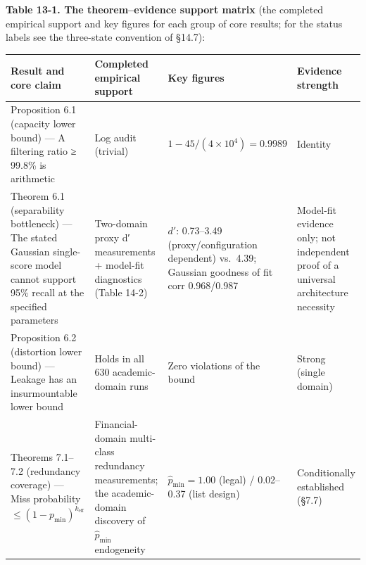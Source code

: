 \documentclass[
  11pt]{article}
\begin{document}
\textbf{Table 13-1. The theorem--evidence support matrix} (the completed
empirical support and key figures for each group of core results; for
the status labels see the three-state convention of §14.7):

\begin{longtable}[]{@{}
  >{\raggedright\arraybackslash}p{}
  >{\raggedright\arraybackslash}p{}
  >{\raggedright\arraybackslash}p{}
  >{\raggedright\arraybackslash}p{}@{}}
\toprule\noalign{}
\begin{minipage}[b]{\linewidth}\raggedright
Result and core claim
\end{minipage} & \begin{minipage}[b]{\linewidth}\raggedright
Completed empirical support
\end{minipage} & \begin{minipage}[b]{\linewidth}\raggedright
Key figures
\end{minipage} & \begin{minipage}[b]{\linewidth}\raggedright
Evidence strength
\end{minipage} \\
\midrule\noalign{}
\endhead
\bottomrule\noalign{}
\endlastfoot
Proposition 6.1 (capacity lower bound) --- A filtering ratio ≥ 99.8\% is
arithmetic & Log audit (trivial) & \(1-45/(4\times10^4)=0.9989\) &
Identity \\
Theorem 6.1 (separability bottleneck) --- The stated Gaussian
single-score model cannot support 95\% recall at the specified
parameters & Two-domain proxy d′ measurements + model-fit diagnostics
(Table 14-2) & \(d'\): 0.73--3.49 (proxy/configuration dependent)
vs.~4.39; Gaussian goodness of fit corr 0.968/0.987 & Model-fit evidence
only; not independent proof of a universal architecture necessity \\
Proposition 6.2 (distortion lower bound) --- Leakage has an
insurmountable lower bound & Holds in all 630 academic-domain runs &
Zero violations of the bound & Strong (single domain) \\
Theorems 7.1--7.2 (redundancy coverage) --- Miss probability
\(\le(1-p_{\min})^{k_{\mathrm{eff}}}\) & Financial-domain multi-class
redundancy measurements; the academic-domain discovery of
\(\hat p_{\min}\) endogeneity & \(\hat p_{\min}=1.00\) (legal) /
0.02--0.37 (list design) & Conditionally established (§7.7) \\

\end{longtable}
\end{document}
